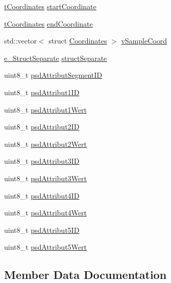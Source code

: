 \begin{DoxyCompactItemize}
\item 
\hyperlink{_psd_message_decoder_8h_a559ada7297c8c6c2337f9e233e73aeca}{t\+Coordinates} \hyperlink{struct_psd_map_data_ab949d9f64982e7cce89b723c95fe01b5}{start\+Coordinate}
\item 
\hyperlink{_psd_message_decoder_8h_a559ada7297c8c6c2337f9e233e73aeca}{t\+Coordinates} \hyperlink{struct_psd_map_data_a5fb30ffcc95a2d29bad59e04804757d1}{end\+Coordinate}
\item 
std\+::vector$<$ struct \hyperlink{struct_coordinates}{Coordinates} $>$ \hyperlink{struct_psd_map_data_a03b022aae0167ffbdf0827f4850e8641}{v\+Sample\+Coord}
\item 
\hyperlink{_psd_message_decoder_8h_a2ba67cb465ee836b9ce8470f32577f21}{e\+\_\+\+Struct\+Separate} \hyperlink{struct_psd_map_data_a9f19a6ccb1eeced87a174728c3025df2}{struct\+Separate}
\item 
uint8\+\_\+t \hyperlink{struct_psd_map_data_a40e775104152a6ae51fb28cb2fb7d70a}{psd\+Attribut\+Segment\+ID}
\item 
uint8\+\_\+t \hyperlink{struct_psd_map_data_ae34340428af587dcc6c3107c0c6c703a}{psd\+Attribut1\+ID}
\item 
uint8\+\_\+t \hyperlink{struct_psd_map_data_a67a275329ea7f8d998c3913c60f41769}{psd\+Attribut1\+Wert}
\item 
uint8\+\_\+t \hyperlink{struct_psd_map_data_a946e6b08753f7e21f4d2ddb3719edb67}{psd\+Attribut2\+ID}
\item 
uint8\+\_\+t \hyperlink{struct_psd_map_data_acc46644be6b612d7c34c5f335e9dfaea}{psd\+Attribut2\+Wert}
\item 
uint8\+\_\+t \hyperlink{struct_psd_map_data_a0aa192ba15a029361a7594b33ab7a65e}{psd\+Attribut3\+ID}
\item 
uint8\+\_\+t \hyperlink{struct_psd_map_data_a0a61989c2cec9807cdc9e93009fe15ce}{psd\+Attribut3\+Wert}
\item 
uint8\+\_\+t \hyperlink{struct_psd_map_data_a52875b4fa9208f2f25c70c7a046c4b6f}{psd\+Attribut4\+ID}
\item 
uint8\+\_\+t \hyperlink{struct_psd_map_data_ad1eab0140ddd2bd43024b0dd39da204b}{psd\+Attribut4\+Wert}
\item 
uint8\+\_\+t \hyperlink{struct_psd_map_data_aa63a8f91cda7bbcb052d89ab1c790b42}{psd\+Attribut5\+ID}
\item 
uint8\+\_\+t \hyperlink{struct_psd_map_data_aa1f43de18baaddd807e57a2f7eaa4166}{psd\+Attribut5\+Wert}
\end{DoxyCompactItemize}


\subsection{Member Data Documentation}
\mbox{\label{struct_psd_map_data_a843771a8237479d2fb51be8583e8324c}} 
